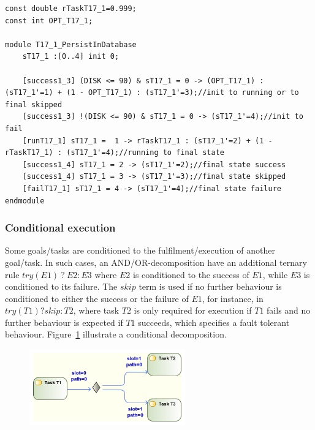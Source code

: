 \begin{lstlisting}[language=Prism, caption={An optional task T17.1 as a DTMC module with additional boolean parameter.},label={lst:PRISM_OPT_TSK}] 
const double rTaskT17_1=0.999;
const int OPT_T17_1;

module T17_1_PersistInDatabase
	sT17_1 :[0..4] init 0;
	
	[success1_3] (DISK <= 90) & sT17_1 = 0 -> (OPT_T17_1) : (sT17_1'=1) + (1 - OPT_T17_1) : (sT17_1'=3);//init to running or to final skipped
	[success1_3] !(DISK <= 90) & sT17_1 = 0 -> (sT17_1'=4);//init to fail
	[runT17_1] sT17_1 =  1 -> rTaskT17_1 : (sT17_1'=2) + (1 - rTaskT17_1) : (sT17_1'=4);//running to final state
	[success1_4] sT17_1 = 2 -> (sT17_1'=2);//final state success
	[success1_4] sT17_1 = 3 -> (sT17_1'=3);//final state skipped
	[failT17_1] sT17_1 = 4 -> (sT17_1'=4);//final state failure
endmodule
\end{lstlisting}

\subsubsection{Conditional execution}

Some goals/tasks are conditioned to the fulfilment/execution of another goal/task. In such cases, an AND/OR-decomposition have an additional ternary rule $try(E1)\ ?\ E2:E3$ where $E2$ is conditioned to the success of $E1$, while $E3$ is conditioned to its failure. The $skip$ term is used if no further behaviour is conditioned to either the success or the failure of $E1$, for instance, in $try(T1)?skip:T2$, where task $T2$ is only required for execution if $T1$ fails and no further behaviour is expected if $T1$ succeeds, which specifies a fault tolerant behaviour. Figure~\ref{fig:UML_TRY_TSKS} illustrate a conditional decomposition.

\begin{figure}[ht!]
\centering
\includegraphics[width=0.60\textwidth]{imgs/UML_TRY_TSKS.png}
\caption{}
\label{fig:UML_TRY_TSKS}
\end{figure}

